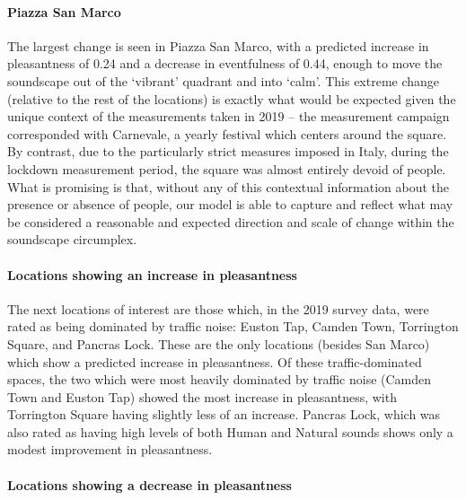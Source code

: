 \documentclass[
  authoryear,
  preprint,
  3p,
  onecolumn]{elsarticle}
\let\oldparagraph\paragraph
\renewcommand{\paragraph}[1]{\oldparagraph{#1}\mbox{}}
\begin{document}
\hypertarget{piazza-san-marco}{%
\paragraph{Piazza San Marco}\label{piazza-san-marco}}

The largest change is seen in Piazza San Marco, with a predicted
increase in pleasantness of 0.24 and a decrease in eventfulness of 0.44,
enough to move the soundscape out of the `vibrant' quadrant and into
`calm'. This extreme change (relative to the rest of the locations) is
exactly what would be expected given the unique context of the
measurements taken in 2019 -- the measurement campaign corresponded with
Carnevale, a yearly festival which centers around the square. By
contrast, due to the particularly strict measures imposed in Italy,
during the lockdown measurement period, the square was almost entirely
devoid of people. What is promising is that, without any of this
contextual information about the presence or absence of people, our
model is able to capture and reflect what may be considered a reasonable
and expected direction and scale of change within the soundscape
circumplex.

\hypertarget{locations-showing-an-increase-in-pleasantness}{%
\paragraph{Locations showing an increase in
pleasantness}\label{locations-showing-an-increase-in-pleasantness}}

The next locations of interest are those which, in the 2019 survey data,
were rated as being dominated by traffic noise: Euston Tap, Camden Town,
Torrington Square, and Pancras Lock. These are the only locations
(besides San Marco) which show a predicted increase in pleasantness. Of
these traffic-dominated spaces, the two which were most heavily
dominated by traffic noise (Camden Town and Euston Tap) showed the most
increase in pleasantness, with Torrington Square having slightly less of
an increase. Pancras Lock, which was also rated as having high levels of
both Human and Natural sounds shows only a modest improvement in
pleasantness.

\hypertarget{locations-showing-a-decrease-in-pleasantness}{%
\paragraph{Locations showing a decrease in
pleasantness}\label{locations-showing-a-decrease-in-pleasantness}}
\end{document}
